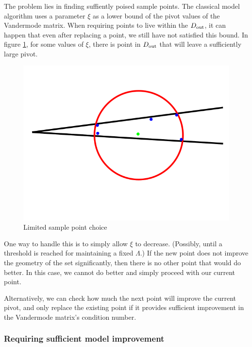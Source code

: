 The problem lies in finding suffiently poised sample points.
The classical model algorithm uses a parameter $\xi$ as a lower bound of the pivot values of the Vandermode matrix.
When requiring points to live within the $ D_{\text{out}} $, it can happen that even after replacing a point, we still have not satisfied this bound.
In figure \ref{lspc}, for some values of $\xi$, there is point in $ D_{\text{out}} $ that will leave a sufficiently large pivot.

\begin{figure}[h]
    \centering
    \includegraphics[scale=0.4]{images/bad_lambda.png}
    \caption{Limited sample point choice}
    \label{lspc}
\end{figure}


One way to handle this is to simply allow $\xi$ to decrease. (Possibly, until a threshold is reached for maintaining a fixed $\Lambda$.)
If the new point does not improve the geometry of the set significantly, then there is no other point that would do better.
In this case, we cannot do better and simply proceed with our current point.

Alternatively, we can check how much the next point will improve the current pivot, and only replace the existing point if it provides sufficient improvement in the Vandermode matrix's condition number.



\subsubsection{Requiring sufficient model improvement}

